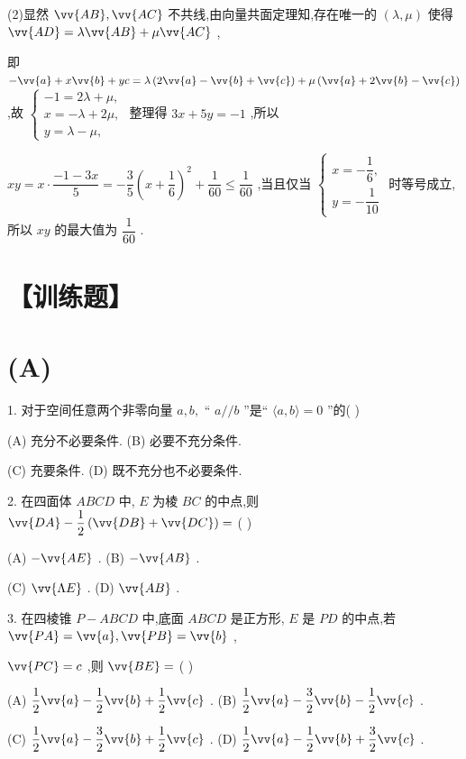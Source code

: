 (2)显然 $\vv{AB},\vv{AC}$ 不共线,由向量共面定理知,存在唯一的 $\left( {\lambda ,\mu }\right)$ 使得 $\vv{AD} = \lambda \vv{AB} + \mu \vv{AC}$ ,

即 $- \vv{a} + x\vv{b} + {yc} = \lambda \left( {2\vv{a} - \vv{b} + \vv{c}}\right)  + \mu \left( {\vv{a} + 2\vv{b} - \vv{c}}\right)$ ,故 $\left\{  \begin{array}{l}  - 1 = {2\lambda } + \mu , \\  x =  - \lambda  + {2\mu }, \\  y = \lambda  - \mu , \end{array}\right.$ 整理得 ${3x} + {5y} =  - 1$ ,所以

${xy} = x \cdot  \dfrac{-1 - {3x}}{5} =  - \dfrac{3}{5}{\left( x + \dfrac{1}{6}\right) }^{2} + \dfrac{1}{60} \leq  \dfrac{1}{60}$ ,当且仅当 $\left\{  \begin{array}{l} x =  - \dfrac{1}{6}, \\  y =  - \dfrac{1}{10} \end{array}\right.$ 时等号成立,所以 ${xy}$ 的最大值为 $\dfrac{1}{60}$ .

\section*{【训练题】}

\section*{(A)}

1. 对于空间任意两个非零向量 $a,b,$ “ $a//b$ ”是“ $\langle a,b\rangle  = 0$ ”的(   )

(A) 充分不必要条件. (B) 必要不充分条件.

(C) 充要条件. (D) 既不充分也不必要条件.

2. 在四面体 ${ABCD}$ 中, $E$ 为棱 ${BC}$ 的中点,则 $\vv{DA} - \dfrac{1}{2}\left( {\vv{DB} + \vv{DC}}\right)  =$ (   )

(A) $- \vv{AE}$ . (B) $- \vv{AB}$ .

(C) $\vv{\Lambda E}$ . (D) $\vv{AB}$ .

3. 在四棱锥 $P - {ABCD}$ 中,底面 ${ABCD}$ 是正方形, $E$ 是 ${PD}$ 的中点,若 $\vv{PA} = \vv{a},\vv{PB} = \vv{b}$ ,

$\vv{PC} = c$ ,则 $\vv{BE} =$ (   )

(A) $\dfrac{1}{2}\vv{a} - \dfrac{1}{2}\vv{b} + \dfrac{1}{2}\vv{c}$ . (B) $\dfrac{1}{2}\vv{a} - \dfrac{3}{2}\vv{b} - \dfrac{1}{2}\vv{c}$ .

(C) $\dfrac{1}{2}\vv{a} - \dfrac{3}{2}\vv{b} + \dfrac{1}{2}\vv{c}$ . (D) $\dfrac{1}{2}\vv{a} - \dfrac{1}{2}\vv{b} + \dfrac{3}{2}\vv{c}$ .

